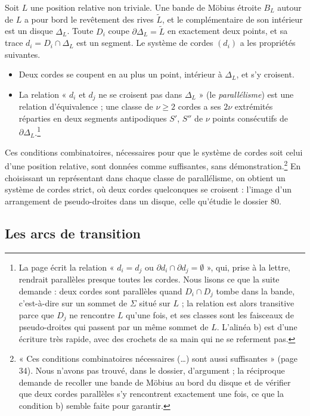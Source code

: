 \documentclass[11pt,a4paper]{article}
\begin{document}
Soit $L$ une position relative non triviale. Une bande de Möbius étroite $B_L$
autour de $L$ a pour bord le revêtement des rives $\widetilde{L}$, et le
complémentaire de son intérieur est un disque $\Delta_L$. Toute $D_i$ coupe
$\partial\Delta_L = \widetilde{L}$ en exactement deux points, et sa trace
$d_i = D_i \cap \Delta_L$ est un segment. Le système de cordes $(d_i)$ a les
propriétés suivantes.
\begin{itemize}
\item[a)] Deux cordes se coupent en au plus un point, intérieur à $\Delta_L$, et
s'y croisent.
\item[b)] La relation « $d_i$ et $d_j$ ne se croisent pas dans $\Delta_L$ » (le
\emph{parallélisme}) est une relation d'équivalence ; une classe de
$\nu \geqslant 2$ cordes a ses $2\nu$ extrémités réparties en deux segments
antipodiques $S'$, $S''$ de $\nu$ points consécutifs de
$\partial\Delta_L$.\footnote{La page écrit la relation « $d_i = d_j$ ou
$\partial d_i \cap \partial d_j = \emptyset$ », qui, prise à la lettre, rendrait
parallèles presque toutes les cordes. Nous lisons ce que la suite demande :
deux cordes sont parallèles quand $D_i \cap D_j$ tombe dans la bande, c'est-à-dire
sur un sommet de $\Sigma$ situé sur $L$ ; la relation est alors transitive
parce que $D_j$ ne rencontre $L$ qu'une fois, et ses classes sont les faisceaux
de pseudo-droites qui passent par un même sommet de $L$. L'alinéa b) est d'une
écriture très rapide, avec des crochets de sa main qui ne se referment pas.}
\end{itemize}
Ces conditions combinatoires, nécessaires pour que le système de cordes soit
celui d'une position relative, sont données comme suffisantes, sans
démonstration.\footnote{« Ces conditions combinatoires nécessaires (\ldots) sont
aussi suffisantes » (page 34). Nous n'avons pas trouvé, dans le dossier,
d'argument ; la réciproque demande de recoller une bande de Möbius au bord du
disque et de vérifier que deux cordes parallèles s'y rencontrent exactement une
fois, ce que la condition b) semble faite pour garantir.} En choisissant un
représentant dans chaque classe de parallélisme, on obtient un système de cordes
strict, où deux cordes quelconques se croisent : l'image d'un arrangement de
pseudo-droites dans un disque, celle qu'étudie le dossier 80.

\subsection*{Les arcs de transition}
\end{document}
